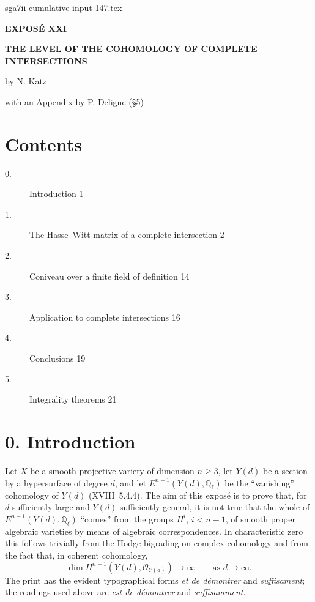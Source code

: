 \begin{filecontents*}{sga7ii-cumulative-input-147.tex}
\clearpage
\begin{center}
{\Large\bfseries EXPOSÉ XXI}\par
\vspace{1.5cm}
{\Large\bfseries THE LEVEL OF THE COHOMOLOGY OF COMPLETE
INTERSECTIONS}\par
\vspace{0.8cm}
{\large by N. Katz}\par
\vspace{0.5cm}
with an Appendix by P. Deligne (\S 5)
\end{center}

\vspace{1.5cm}
\section*{Contents}
\begin{description}
\item[0.] Introduction \hfill 1
\item[1.] The Hasse--Witt matrix of a complete intersection \hfill 2
\item[2.] Coniveau over a finite field of definition \hfill 14
\item[3.] Application to complete intersections \hfill 16
\item[4.] Conclusions \hfill 19
\item[5.] Integrality theorems \hfill 21
\end{description}

\clearpage
\section*{0. Introduction}

Let $X$ be a smooth projective variety of dimension $n\geq3$, let $Y(d)$
be a section by a hypersurface of degree $d$, and let
$E^{n-1}(Y(d),\mathbb Q_\ell)$ be the ``vanishing'' cohomology of $Y(d)$
(XVIII~5.4.4).  The aim of this exposé is to prove that, for $d$
sufficiently large and $Y(d)$ sufficiently general, it is not true that the
whole of $E^{n-1}(Y(d),\mathbb Q_\ell)$ ``comes'' from the groups $H^i$,
$i<n-1$, of smooth proper algebraic varieties by means of algebraic
correspondences.  In characteristic zero this follows trivially from the
Hodge bigrading on complex cohomology and from the fact that, in coherent
cohomology,
\begin{equation*}
\dim H^{n-1}(Y(d),\mathcal O_{Y(d)})\longrightarrow\infty
\qquad\text{as }d\longrightarrow\infty.
\end{equation*}
The print has the evident typographical forms \emph{et de démontrer} and
\emph{suffisament}; the readings used above are \emph{est de démontrer} and
\emph{suffisamment}.


\end{filecontents*}
